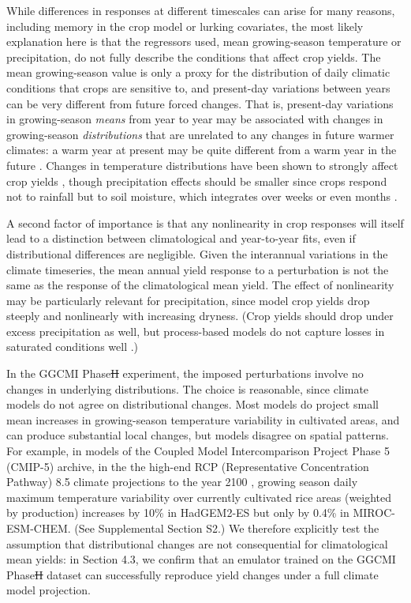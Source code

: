 \documentclass[gmdd]{copernicus} %
\providecommand{\DIFadd}[1]{{\protect\color{blue}\uwave{#1}}} %
\providecommand{\DIFdel}[1]{{\protect\color{red}\sout{#1}}}                      %
\providecommand{\DIFaddbegin}{} %
\providecommand{\DIFaddend}{} %
\providecommand{\DIFdelbegin}{} %
\providecommand{\DIFdelend}{} %
\begin{document}
While differences in responses at different timescales can arise for many reasons, including memory in the crop model or lurking covariates, the most likely explanation here is that the regressors used, mean growing-season temperature or precipitation, do not fully describe the conditions that affect crop yields. 
The mean growing-season value is only a proxy for the distribution of daily climatic conditions that crops are sensitive to, and present-day variations between years can be very different from future forced changes. 
That is, present-day variations in growing-season \textit{means} from year to year may be associated with changes in growing-season \textit{distributions} that are unrelated to any changes in future warmer climates: a warm year at present may be quite different from a warm year in the future \citep[e.g.][]{Ruane2016}.
Changes in temperature distributions have been shown to strongly affect crop yields \citep[e.g.][]{Hansen2000, Gadgil2002}, though precipitation effects should be smaller since crops respond not to rainfall but to soil moisture, which integrates over weeks or even months \citep[e.g.][]{potter2005effects, Glotter14, CHALLINOR200499}. 

A second factor of importance is that any nonlinearity in crop responses will itself lead to a distinction between climatological and year-to-year fits, even if distributional differences are negligible. 
Given the interannual variations in the climate timeseries, the mean annual yield response to a perturbation is not the same as the response of the climatological mean yield. 
The effect of nonlinearity may be particularly relevant for precipitation, since model crop yields drop steeply and nonlinearly with increasing dryness. 
(Crop yields should drop under excess precipitation as well, but process-based models do not capture losses in saturated conditions well \citep{Glotter15,Li2019}.) 

In the GGCMI Phase\DIFdelbegin \DIFdel{II }\DIFdelend \DIFaddbegin \DIFadd{~2 }\DIFaddend experiment, the imposed perturbations involve no changes in underlying distributions.
The choice is reasonable, since climate models do not agree on distributional changes.
Most models do project small mean increases in growing-season temperature variability in cultivated areas, and can produce substantial local changes, but models disagree on spatial patterns.
For example, in models of the Coupled Model Intercomparison Project Phase 5 (CMIP-5) archive, in the the high-end RCP (Representative Concentration Pathway) 8.5 climate projections to the year 2100 \citep{riahi2011rcp}, growing season daily maximum temperature variability over currently cultivated rice areas (weighted by production) increases by 10\% in HadGEM2-ES but only by 0.4\% in MIROC-ESM-CHEM. (See Supplemental Section S2.)
We therefore explicitly test the assumption that distributional changes are not consequential for climatological mean yields: in Section 4.3, we confirm that an emulator trained on the GGCMI Phase\DIFdelbegin \DIFdel{II }\DIFdelend \DIFaddbegin \DIFadd{~2 }\DIFaddend dataset can successfully reproduce yield changes under a full climate model projection.
\end{document}
